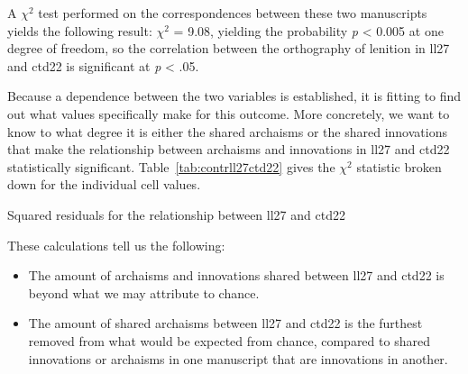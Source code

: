 

A \(\chi^2\) test performed on the correspondences between these two manuscripts yields the following result: \(\chi^2\) = 9.08, yielding the probability \emph{p} < 0.005 at one degree of freedom, so the correlation between the orthography of lenition in \gls{ll27} and \gls{ctd22} is  significant at \textit{p} < .05.

Because a dependence between the two variables is established, it is fitting to find out what values specifically make for this outcome. More concretely, we want to know to what degree it is either the shared archaisms or the shared innovations that make the relationship between archaisms and innovations in \gls{ll27} and \gls{ctd22} statistically significant. Table~\ref{tab:contrll27ctd22} gives the \(\chi^2\) statistic broken down for the individual cell values.

\begin{table}[h]
  \centering
  
  \caption{Squared residuals for the relationship between \gls{ll27} and \gls{ctd22}}
  \label{tab:contrll27ctd22}
\end{table}

These calculations tell us the following:
\begin{itemize}
\item The amount of archaisms and innovations shared between \gls{ll27} and \gls{ctd22} is beyond what we may attribute to chance.
\item The amount of shared archaisms between \gls{ll27} and \gls{ctd22} is the furthest removed from what would be expected from chance, compared to shared innovations or archaisms in one manuscript that are innovations in another.
\end{itemize}


